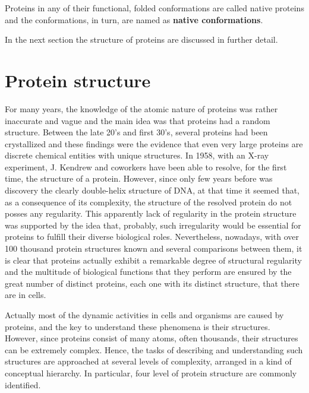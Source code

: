 Proteins in any of their functional, folded conformations are called native proteins and the conformations, in turn, are named as \textbf{native conformations}.





In the next section the structure of proteins are discussed in further detail.

\section{Protein structure}\label{sec:prot-structure}
For many years, the knowledge of the atomic nature of proteins was rather inaccurate and vague and the main idea was that proteins had a random structure. Between the late 20's and first 30's, several proteins had been crystallized and these findings were the evidence that even very large proteins are discrete chemical entities with unique structures. 
In 1958, with an X-ray experiment, J. Kendrew and coworkers have been able to resolve, for the first time, the structure of a protein. However, since only few years before was discovery the clearly double-helix structure of DNA, at that time it seemed that, as a consequence of its complexity, the structure of the resolved protein do not posses any regularity. This apparently lack of regularity in the protein structure was supported by the idea that, probably, such irregularity would be essential for proteins to fulfill their diverse biological roles. Nevertheless, nowadays, with over 100 thousand protein structures known and several comparisons between them, it is clear that proteins actually exhibit a remarkable degree of structural regularity and the multitude of biological functions that they perform are ensured by the great number of distinct proteins, each one with its distinct structure, that there are in cells.

Actually most of the dynamic activities in cells and organisms are caused by proteins, and the key to understand these phenomena is their structures. However, since proteins consist of many atoms, often thousands, their structures can be extremely complex. Hence, the tasks of describing and understanding such structures are approached at several levels of complexity, arranged in a kind of conceptual hierarchy. In particular, four level of protein structure are commonly identified. 

